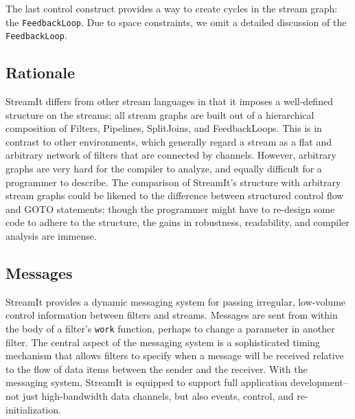 The last control construct provides a way to create cycles in the
stream graph: the {\tt FeedbackLoop}.  Due to space constraints, we
omit a detailed discussion of the {\tt FeedbackLoop}.

\subsection{Rationale}

StreamIt differs from other stream languages in that it imposes a
well-defined structure on the streams; all stream graphs are built out
of a hierarchical composition of Filters, Pipelines, SplitJoins, and
FeedbackLoops.  This is in contrast to other environments, which
generally regard a stream as a flat and arbitrary network of filters
that are connected by channels.  However, arbitrary graphs are very
hard for the compiler to analyze, and equally difficult for a
programmer to describe.  The comparison of StreamIt's structure with
arbitrary stream graphs could be likened to the difference between
structured control flow and GOTO statements; though the programmer
might have to re-design some code to adhere to the structure, the
gains in robustness, readability, and compiler analysis are immense.

\subsection{Messages}

StreamIt provides a dynamic messaging system for passing irregular,
low-volume control information between filters and streams.  Messages
are sent from within the body of a filter's {\tt work} function,
perhaps to change a parameter in another filter.  The central aspect
of the messaging system is a sophisticated timing mechanism that
allows filters to specify when a message will be received relative to
the flow of data items between the sender and the receiver.  With the
messaging system, StreamIt is equipped to support full application
development--not just high-bandwidth data channels, but also events,
control, and re-initialization.
